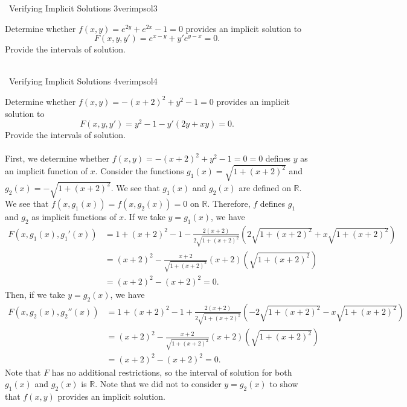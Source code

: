 \pagebreak

        \begin{example}{\Difficulty\,\Difficulty\,\,Verifying Implicit Solutions 3}{verimpsol3}
                    
            Determine whether \(f(x,y)=e^{2y}+e^{2x}-1=0\) provides an implicit solution to
            \begin{equation*}
                F(x,y,y')=e^{x-y}+y'e^{y-x}=0.
            \end{equation*}
            Provide the intervals of solution.
            \\
            \\
            \DOTHISLATER
            \DOTHISLATER
            
        \end{example}
        \pagebreak
        \begin{example}{\Difficulty\,\Difficulty\,\,Verifying Implicit Solutions 4}{verimpsol4}
                    
            Determine whether \(f(x,y)=-(x+2)^2+y^2-1=0\) provides an implicit solution to
            \begin{equation*}
                F(x,y,y')=y^2-1-y'(2y+xy)=0.
            \end{equation*}
            Provide the intervals of solution.
            \\
            \\
            First, we determine whether \(f(x,y)=-(x+2)^2+y^2-1=0=0\) defines \(y\) as an implicit function of \(x\). Consider the functions \(g_1(x)=\sqrt{1+(x+2)^2}\) and \(g_2(x)=-\sqrt{1+(x+2)^2}\). We see that \(g_1(x)\) and \(g_2(x)\) are defined on \(\mathbb{R}\). We see that \(f(x,g_1(x))=f(x,g_2(x))=0\) on \(\mathbb{R}\). Therefore, \(f\) defines \(g_1\) and \(g_2\) as implicit functions of \(x\). If we take \(y=g_1(x)\), we have
            \begin{align*}
               F(x,g_1(x),g_1'(x))&=1+(x+2)^2-1-\frac{2(x+2)}{2\sqrt{1+(x+2)^2}}(2\sqrt{1+(x+2)^2}+x\sqrt{1+(x+2)^2}) \\
               &=(x+2)^2-\frac{x+2}{\sqrt{1+(x+2)^2}}(x+2)(\sqrt{1+(x+2)^2}) \\
               &=(x+2)^2-(x+2)^2=0.
            \end{align*}
            Then, if we take \(y=g_2(x)\), we have
            \begin{align*}
                F(x,g_2(x),g_2''(x))&=1+(x+2)^2-1+\frac{2(x+2)}{2\sqrt{1+(x+2)^2}}(-2\sqrt{1+(x+2)^2}-x\sqrt{1+(x+2)^2}) \\
                &=(x+2)^2-\frac{x+2}{\sqrt{1+(x+2)^2}}(x+2)(\sqrt{1+(x+2)^2}) \\
                &=(x+2)^2-(x+2)^2=0.
             \end{align*}
            Note that \(F\) has no additional restrictions, so the interval of solution for both \(g_1(x)\) and \(g_2(x)\) is \(\mathbb{R}\). Note that we did not to consider \(y=g_2(x)\) to show that \(f(x,y)\) provides an implicit solution.
            
        \end{example}

